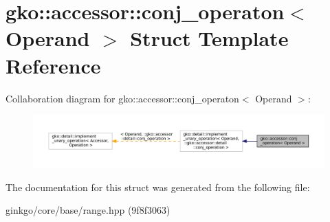 \hypertarget{structgko_1_1accessor_1_1conj__operaton}{}\section{gko\+:\+:accessor\+:\+:conj\+\_\+operaton$<$ Operand $>$ Struct Template Reference}
\label{structgko_1_1accessor_1_1conj__operaton}


Collaboration diagram for gko\+:\+:accessor\+:\+:conj\+\_\+operaton$<$ Operand $>$\+:
\nopagebreak
\begin{figure}[H]
\begin{center}
\leavevmode
\includegraphics[width=350pt]{structgko_1_1accessor_1_1conj__operaton__coll__graph}
\end{center}
\end{figure}


The documentation for this struct was generated from the following file\+:\begin{DoxyCompactItemize}
\item 
ginkgo/core/base/range.\+hpp (9f8f3063)\end{DoxyCompactItemize}
